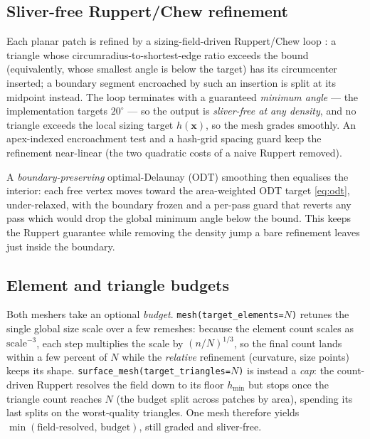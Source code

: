\documentclass[11pt,a4paper]{article}
\numberwithin{equation}{section}
\newcommand{\vv}[1]{\mathbf{#1}}
\DeclareRobustCommand{\code}[1]{\texttt{#1}}
\begin{document}
\subsection{Sliver-free Ruppert/Chew refinement}
Each planar patch is refined by a sizing-field-driven Ruppert/Chew loop
\cite{Ruppert1995,Chew1993}: a triangle whose circumradius-to-shortest-edge ratio
exceeds the bound (equivalently, whose smallest angle is below the target) has its
circumcenter inserted; a boundary segment encroached by such an insertion is split
at its midpoint instead. The loop terminates with a guaranteed \emph{minimum
angle} --- the implementation targets $20^\circ$ --- so the output is
\emph{sliver-free at any density}, and no triangle exceeds the local sizing target
$h(\vv{x})$, so the mesh grades smoothly. An apex-indexed encroachment test and a
hash-grid spacing guard keep the refinement near-linear (the two quadratic costs of
a naive Ruppert removed).

A \emph{boundary-preserving} optimal-Delaunay (ODT) smoothing then equalises the
interior: each free vertex moves toward the area-weighted ODT target
\eqref{eq:odt}, under-relaxed, with the boundary frozen and a per-pass guard that
reverts any pass which would drop the global minimum angle below the bound. This
keeps the Ruppert guarantee while removing the density jump a bare refinement
leaves just inside the boundary.

\subsection{Element and triangle budgets}
\label{sec:budget}
Both meshers take an optional \emph{budget}. \code{mesh(target\_elements=$N$)}
retunes the single global size scale over a few remeshes: because the element
count scales as $\mathrm{scale}^{-3}$, each step multiplies the scale by
$(n/N)^{1/3}$, so the final count lands within a few percent of $N$ while the
\emph{relative} refinement (curvature, size points) keeps its shape.
\code{surface\_mesh(target\_triangles=$N$)} is instead a \emph{cap}: the
count-driven Ruppert resolves the field down to its floor $h_{\min}$ but stops once
the triangle count reaches $N$ (the budget split across patches by area), spending
its last splits on the worst-quality triangles. One mesh therefore yields
$\min(\text{field-resolved},\,\text{budget})$, still graded and sliver-free.
\end{document}
